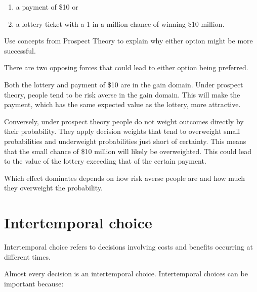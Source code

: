 \documentclass[
  letterpaper,
  DIV=11,
  numbers=noendperiod]{scrreprt}
\begin{document}
\begin{enumerate}
\def\labelenumi{\roman{enumi})}
\item
  a payment of \$10 or
\item
  a lottery ticket with a 1 in a million chance of winning \$10 million.
\end{enumerate}

Use concepts from Prospect Theory to explain why either option might be
more successful.

\begin{tcolorbox}[enhanced jigsaw, title=\textcolor{quarto-callout-tip-color}{\faLightbulb}\hspace{0.5em}{Answer}, toprule=.15mm, colback=white, breakable, titlerule=0mm, colframe=quarto-callout-tip-color-frame, coltitle=black, opacityback=0, rightrule=.15mm, colbacktitle=quarto-callout-tip-color!10!white, bottomtitle=1mm, opacitybacktitle=0.6, arc=.35mm, bottomrule=.15mm, toptitle=1mm, leftrule=.75mm, left=2mm]

There are two opposing forces that could lead to either option being
preferred.

Both the lottery and payment of \$10 are in the gain domain. Under
prospect theory, people tend to be risk averse in the gain domain. This
will make the payment, which has the same expected value as the lottery,
more attractive.

Conversely, under prospect theory people do not weight outcomes directly
by their probability. They apply decision weights that tend to
overweight small probabilities and underweight probabilities just short
of certainty. This means that the small chance of \$10 million will
likely be overweighted. This could lead to the value of the lottery
exceeding that of the certain payment.

Which effect dominates depends on how risk averse people are and how
much they overweight the probability.

\end{tcolorbox}

\part{Intertemporal choice}

Intertemporal choice refers to decisions involving costs and benefits
occurring at different times.

Almost every decision is an intertemporal choice. Intertemporal choices
can be important because:
\end{document}
